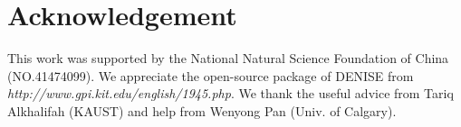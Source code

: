 \section{Acknowledgement}
This work was supported by the
National Natural Science Foundation of China (NO.41474099).
We appreciate the open-source package of DENISE from 
\textit{http://www.gpi.kit.edu/english/1945.php}. We thank the useful advice from
Tariq Alkhalifah (KAUST) and help from Wenyong Pan (Univ. of Calgary).


